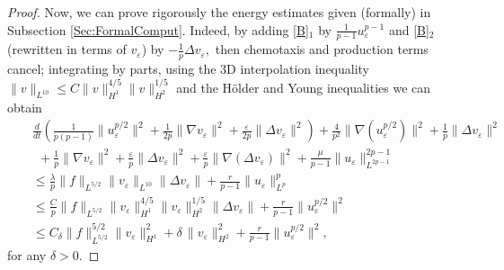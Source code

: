 \documentclass[11pt,reqno]{amsart}%
\numberwithin{equation}{section}
\begin{document}
{\begin{proof}
Now, we can prove rigorously  the energy estimates given (formally) in Subsection \ref{Sec:FormalComput}. Indeed, by adding \eqref{B}$_1$ by $\frac{1}{p-1}u_\varepsilon^{p-1}$ and \eqref{B}$_2$ (rewritten in terms of $ v_\varepsilon$) by $-\frac1p\Delta v_\varepsilon,$ then chemotaxis and production terms cancel; 
integrating by parts, using the 3D interpolation inequality $\|v\|_{L^{10}}\le C\|v\|^{4/5}_{H^1}\|v\|^{1/5}_{H^2}$
and  the H\"older and Young inequalities  
we can obtain 
\begin{eqnarray}
&&\frac{d}{dt}\left(\frac{1}{p(p-1)}\|u_\varepsilon^{p/2}\|^2+\frac{1}{2p}\|\nabla v_\varepsilon\|^2
+\frac{\varepsilon}{2p}\|\Delta v_\varepsilon\|^2\right)+\frac{4}{p^2}\|\nabla(u_\varepsilon^{p/2})\|^2+\frac1p\|\Delta v_\varepsilon\|^2\nonumber\\
&&\ \ +\frac1p\|\nabla v_\varepsilon\|^2+ \frac{\varepsilon}{p}\|\Delta v_\varepsilon\|^2+\frac{\varepsilon}{p}\|\nabla(\Delta v_\varepsilon)\|^2
+ \frac{\mu }{p-1} \| u_\varepsilon \|_{L^{2p-1}}^{2p-1}
\nonumber\\
&&
\le {\frac{\lambda}{p}\|f\|_{L^{5/2}}\|v_\varepsilon\|_{L^{10}}\|\Delta v_\varepsilon\|}
+ \frac{ r }{p-1} \| u_\varepsilon \|_{L^{p}}^{p}
\nonumber\\
&&\le {\frac{C}{p}\|f\|_{L^{5/2}}\|v_\varepsilon\|^{4/5}_{H^{1}}\|v_\varepsilon\|^{1/5}_{H^{2}}\|\Delta v_\varepsilon\|}
+ \frac{ r }{p-1} \| u_\varepsilon ^{p/2} \|^{2}
 \nonumber\\
&&\le C_\delta \|f\|^{5/2}_{L^{5/2}}\|v_\varepsilon\|^2_{H^1}+ %
\delta\, \|v_\varepsilon\|^2_{H^2}
+ \frac{ r }{p-1} \| u_\varepsilon ^{p/2} \|^{2} , \label{B-2-1}
\end{eqnarray}
for any $\delta>0.$ 

\end{proof}}
\end{document}
